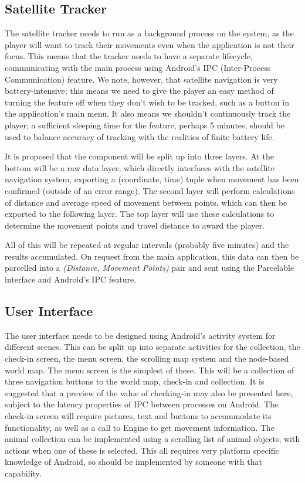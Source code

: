 \documentclass[12pt,a4paper,twoside]{article}
\begin{document}
\subsection{Satellite Tracker}
The satellite tracker needs to run as a background process on the system, as the player will want to track their movements even when the application is not their focus.
This means that the tracker needs to have a separate lifecycle, communicating with the main process using Android's IPC (Inter-Process Communication) feature.
We note, however, that satellite navigation is very battery-intensive; this means we need to give the player an easy method of turning the feature off when they don't wish to be tracked, such as a button in the application's main menu.
It also means we shouldn't continuously track the player; a sufficient sleeping time for the feature, perhaps 5 minutes, should be used to balance accuracy of tracking with the realities of finite battery life.


It is proposed that the component will be split up into three layers.
At the bottom will be a raw data layer, which directly interfaces with the satellite navigation system, exporting a (coordinate, time) tuple when movement has been confirmed (outside of an error range).
The second layer will perform calculations of distance and average speed of movement between points, which can then be exported to the following layer.
The top layer will use these calculations to determine the movement points and travel distance to award the player.


All of this will be repeated at regular intervals (probably five minutes) and the results accumulated.
On request from the main application, this data can then be parcelled into a \textit{(Distance, Movement Points)} pair and sent using the Parcelable interface and Android's IPC feature.

\subsection{User Interface}
The user interface needs to be designed using Android's activity system for different scenes.
This can be split up into separate activities for the collection, the check-in screen, the menu screen, the scrolling map system and the node-based world map.
The menu screen is the simplest of these.
This will be a collection of three navigation buttons to the world map, check-in and collection.
It is suggested that a preview of the value of checking-in may also be presented here, subject to the latency properties of IPC between processes on Android.
The check-in screen will require pictures, text and buttons to accommodate its functionality, as well as a call to Engine to get movement information.
The animal collection can be implemented using a scrolling list of animal objects, with actions when one of these is selected.
This all requires very platform specific knowledge of Android, so should be implemented by someone with that capability.
\end{document}
